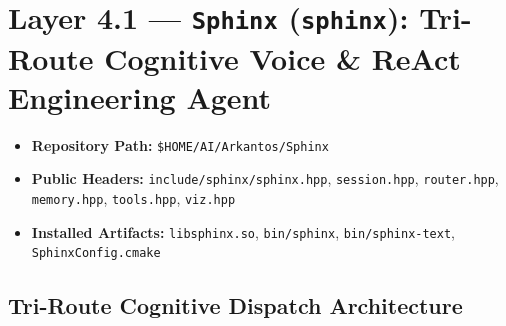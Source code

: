 \documentclass[11pt,a4paper]{article}
\begin{document}
\section{Layer 4.1 --- \texttt{Sphinx} (\texttt{sphinx}): Tri-Route Cognitive Voice \& ReAct Engineering Agent}

\begin{itemize}[leftmargin=1.5em,itemsep=1pt]
  \item \textbf{Repository Path:} \texttt{\$HOME/AI/Arkantos/Sphinx}
  \item \textbf{Public Headers:} \texttt{include/sphinx/sphinx.hpp}, \texttt{session.hpp}, \texttt{router.hpp}, \texttt{memory.hpp}, \texttt{tools.hpp}, \texttt{viz.hpp}
  \item \textbf{Installed Artifacts:} \texttt{libsphinx.so}, \texttt{bin/sphinx}, \texttt{bin/sphinx-text}, \texttt{SphinxConfig.cmake}
\end{itemize}

\subsection{Tri-Route Cognitive Dispatch Architecture}
\end{document}
